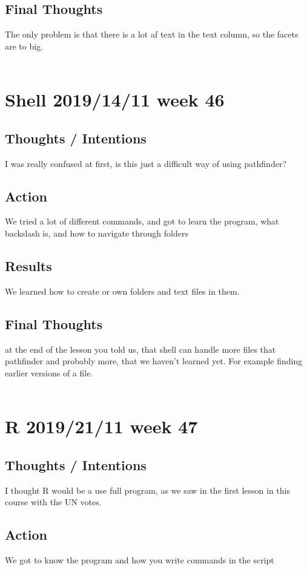\documentclass{article}
\begin{document}
\subsection{Final Thoughts} The only problem is that there is a lot af text in the text column, so the facets are to big.\\\\

\section{Shell 2019/14/11 week 46}
\subsection{Thoughts / Intentions} I was really confused at first, is this just a difficult way of using pathfinder?  
\subsection{Action} We tried a lot of different commands, and got to learn the program, what backslash is, and how to navigate through folders
\subsection{Results} We learned how to create or own folders and text files in them. 
\subsection{Final Thoughts} at the end of the lesson you told us, that shell can handle more files that pathfinder and probably more, that we haven't learned yet. For example finding earlier versions of a file. \\\\

\section{R 2019/21/11 week 47}
\subsection{Thoughts / Intentions} I thought R would be a use full program, as we saw in the first lesson in this course with the UN votes.  
\subsection{Action} We got to know the program and how you write commands in the script 
\end{document}
